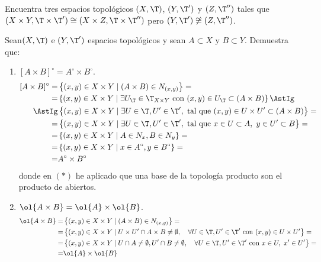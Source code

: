 \begin{ejercicio}
    Encuentra tres espacios topológicos $(X,\T)$, $(Y, \T')$ y $(Z, \T'')$ tales que $(X \times Y, \T \times \T') \cong (X \times Z, \T \times \T'')$ pero $(Y, \T')\not \cong (Z, \T'')$.
\end{ejercicio}


\begin{ejercicio}
    Sean$ (X,\T)$ e $(Y, \T')$ espacios topológicos y sean $A \subset X$ y $B \subset Y$. Demuestra que:
    \begin{enumerate}
        \item $[A\times B]^\circ = A^\circ \times B^\circ$.
        \begin{equation*}
            \begin{split}
                [A\times B]^\circ =& \left\{(x,y)\in X\times Y\mid (A\times B)\in N_{(x,y)}\right\} =\\
                =& \left\{(x,y)\in X\times Y\mid \exists U_\T\in \T_{X\times Y} \text{ con } (x,y)\in U_\T\subset (A\times B)\right\} \AstIg\\
                \AstIg& \left\{(x,y)\in X\times Y\mid \exists U\in \T, U'\in \T', \text{ tal que } (x,y)\in U\times U'\subset (A\times B)\right\} =\\
                = & \left\{(x,y)\in X\times Y\mid \exists U\in \T, U'\in \T', \text{ tal que } x\in U\subset A,~y\in U'\subset B\right\} =\\
                = & \left\{(x,y)\in X\times Y\mid  A\in N_x,B\in N_y\right\} =\\
                = & \left\{(x,y)\in X\times Y\mid x\in A^\circ, y\in B^\circ\right\} =\\
                =& A^\circ \times B^\circ
            \end{split}
        \end{equation*}
        donde en $(\ast)$ he aplicado que una base de la topología producto son el producto de abiertos.
        \item $\ol{A\times B}=\ol{A}\times \ol{B}$.
        \begin{equation*}
            \begin{split}
                \ol{A\times B} =& \left\{(x,y)\in X\times Y\mid (A\times B)\in N_{(x,y)}\right\} =\\
                =& \left\{(x,y)\in X\times Y\mid U\times U'\cap A\times B\neq \emptyset,\quad \forall U\in \T, U'\in \T' \text{ con } (x,y)\in U\times U'\right\} =\\
                =& \left\{(x,y)\in X\times Y\mid U\cap A\neq \emptyset, U'\cap B\neq \emptyset,\quad \forall U\in \T, U'\in \T' \text{ con } x\in U,~x'\in U'\right\} =\\
                =& \ol{A}\times \ol{B}
            \end{split}
        \end{equation*}
        

\end{enumerate}
\end{ejercicio}

